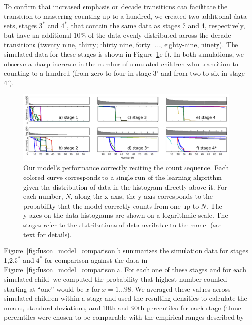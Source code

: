 \documentclass[10pt,letterpaper]{article}
\begin{document}
To confirm that increased emphasis on decade transitions can
facilitate the transition to mastering counting up to a hundred, we
created two additional data sets, stages $3^*$ and $4^*$, that contain the
same data as stages 3 and 4, respectively, but have an additional
$10\%$ of the data evenly distributed across the decade transitions
(twenty nine, thirty; thirty nine, forty; ..., eighty-nine,
ninety). The simulated data for these stages is shown in
Figure~\ref{fig:counting_grid}e-f). In both simulations, we observe a
sharp increase in the number of simulated children who transition to
counting to a hundred (from zero to four in stage 3' and from two to
six in stage 4').



\begin{figure}[t]
  \includegraphics[width=\linewidth]{figures/counting_grid2}
  \caption{Our model's performance correctly reciting the count
    sequence. Each colored curve corresponds to a single run of the learning
    algorithm given the distribution of data in the histogram directly
    above it. For each number, $N$, along the x-axis, the y-axis
    corresponds to the probability that the model correctly counts
    from one up to $N$. The y-axes on the data histograms are shown on
    a logarithmic scale. The stages refer to the distributions of data
    available to the model (see text for details).
  }\label{fig:counting_grid}
\end{figure}


Figure~\ref{fig:fuson_model_comparison}b summarizes the simulation
data for stages 1,2,$3^*$ and $4^*$ for comparison against the
\citeauthor{FusRicBriar1982} data in
Figure~\ref{fig:fuson_model_comparison}a. For each one of these stages
and for each simulated child, we computed the probability that highest
number counted starting at ``one'' would be $x$ for $x=1 \dots 98$. We
averaged these values across simulated children within a stage and
used the resulting densities to calculate the means, standard
deviations, and 10th and 90th percentiles for each stage (these
percentiles were chosen to be comparable with the empirical ranges described
by \citeauthor{FusRicBriar1982}
\end{document}
